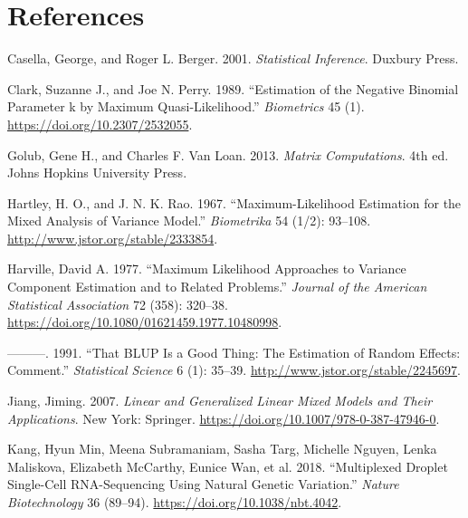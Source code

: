 \documentclass[
]{article}
\newlength{\cslhangindent}
\newlength{\cslentryspacingunit} %
\newenvironment{CSLReferences}[2] %
 {%
  \setlength{\parindent}{0pt}
  \ifodd #1
  \let\oldpar\par
  \def\par{\hangindent=\cslhangindent\oldpar}
  \fi
  \setlength{\parskip}{#2\cslentryspacingunit}
 }%
 {}
\begin{document}
\hypertarget{references}{%
\section*{References}\label{references}}

\hypertarget{refs}{}
\begin{CSLReferences}{1}{0}
\leavevmode{}%
Casella, George, and Roger L. Berger. 2001. \emph{Statistical
Inference}. Duxbury Press.

\leavevmode{}%
Clark, Suzanne J., and Joe N. Perry. 1989. {``Estimation of the Negative
Binomial Parameter k by Maximum Quasi-Likelihood.''} \emph{Biometrics}
45 (1). \url{https://doi.org/10.2307/2532055}.

\leavevmode{}%
Golub, Gene H., and Charles F. Van Loan. 2013. \emph{Matrix
Computations}. 4th ed. Johns Hopkins University Press.

\leavevmode{}%
Hartley, H. O., and J. N. K. Rao. 1967. {``Maximum-Likelihood Estimation
for the Mixed Analysis of Variance Model.''} \emph{Biometrika} 54 (1/2):
93--108. \url{http://www.jstor.org/stable/2333854}.

\leavevmode{}%
Harville, David A. 1977. {``Maximum Likelihood Approaches to Variance
Component Estimation and to Related Problems.''} \emph{Journal of the
American Statistical Association} 72 (358): 320--38.
\url{https://doi.org/10.1080/01621459.1977.10480998}.

\leavevmode{}%
---------. 1991. {``That BLUP Is a Good Thing: The Estimation of Random
Effects: Comment.''} \emph{Statistical Science} 6 (1): 35--39.
\url{http://www.jstor.org/stable/2245697}.

\leavevmode{}%
Jiang, Jiming. 2007. \emph{Linear and Generalized Linear Mixed Models
and Their Applications}. New York: Springer.
\url{https://doi.org/10.1007/978-0-387-47946-0}.

\leavevmode{}%
Kang, Hyun Min, Meena Subramaniam, Sasha Targ, Michelle Nguyen, Lenka
Maliskova, Elizabeth McCarthy, Eunice Wan, et al. 2018. {``Multiplexed
Droplet Single-Cell RNA-Sequencing Using Natural Genetic Variation.''}
\emph{Nature Biotechnology} 36 (89--94).
\url{https://doi.org/10.1038/nbt.4042}.


\end{CSLReferences}
\end{document}
